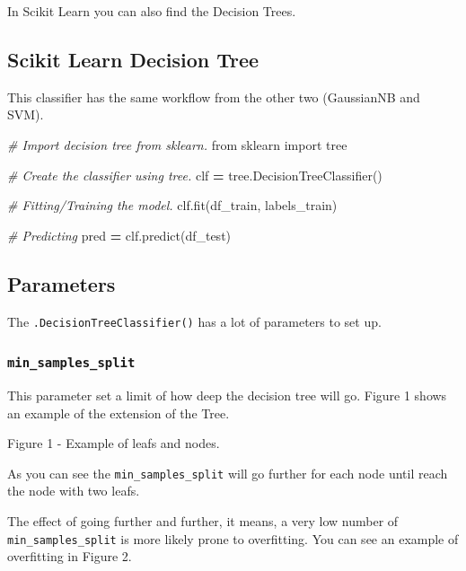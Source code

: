 \documentclass[]{book}
\newenvironment{Shaded}{\begin{snugshade}}{\end{snugshade}}
\newcommand{\ImportTok}[1]{#1}
\newcommand{\CommentTok}[1]{\textcolor[rgb]{0.56,0.35,0.01}{\textit{#1}}}
\newcommand{\OperatorTok}[1]{\textcolor[rgb]{0.81,0.36,0.00}{\textbf{#1}}}
\newcommand{\NormalTok}[1]{#1}
\begin{document}
In Scikit Learn you can also find the Decision Trees.

\subsection{Scikit Learn Decision
Tree}\label{scikit-learn-decision-tree}

This classifier has the same workflow from the other two (GaussianNB and
SVM).

\begin{Shaded}
\begin{Highlighting}[]
\CommentTok{# Import decision tree from sklearn.}
\ImportTok{from}\NormalTok{ sklearn }\ImportTok{import}\NormalTok{ tree}

\CommentTok{# Create the classifier using tree.}
\NormalTok{clf }\OperatorTok{=}\NormalTok{ tree.DecisionTreeClassifier()}

\CommentTok{# Fitting/Training the model.}
\NormalTok{clf.fit(df_train, labels_train)}

\CommentTok{# Predicting}
\NormalTok{pred }\OperatorTok{=}\NormalTok{ clf.predict(df_test)}
\end{Highlighting}
\end{Shaded}

\subsection{Parameters}\label{parameters-1}

The \texttt{.DecisionTreeClassifier()} has a lot of parameters to set
up.

\subsubsection{\texorpdfstring{\texttt{min\_samples\_split}}{min\_samples\_split}}\label{min_samples_split}

This parameter set a limit of how deep the decision tree will go. Figure
1 shows an example of the extension of the Tree.

Figure 1 - Example of leafs and nodes.

As you can see the \texttt{min\_samples\_split} will go further for each
node until reach the node with two leafs.

The effect of going further and further, it means, a very low number of
\texttt{min\_samples\_split} is more likely prone to overfitting. You
can see an example of overfitting in Figure 2.
\end{document}
